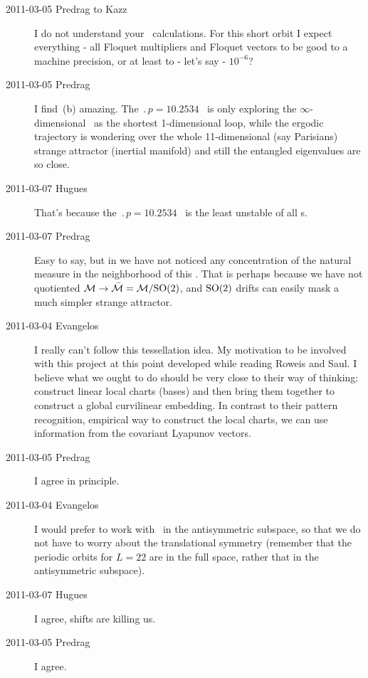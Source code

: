 \begin{description}
\item[2011-03-05 Predrag to Kazz] I do not understand your \po\ calculations.
For this short orbit I expect everything - all Floquet multipliers and
Floquet vectors to be good to a machine precision, or at least to - let's say -
$10^{-6}$?

\item[2011-03-05 Predrag]
I find
\,(b) amazing. The $\period{p}=10.2534$ \po\ is
only exploring the $\infty$-dimensional \statesp\ as the
shortest 1-dimensional loop, while the ergodic trajectory is
wondering over the whole 11-dimensional (say Parisians) strange attractor
(inertial manifold) and still the entangled eigenvalues are so close.

\item[2011-03-07 Hugues]
That's because the $\period{p}=10.2534$ \po\ is the least unstable of all
\po s.

\item[2011-03-07 Predrag] Easy to say, but in  we have
not noticed any concentration of the natural measure in the neighborhood of
this \po. That is perhaps because we have not quotiented
${\cal M} \to \bar{\cal M} = {\cal M}/\textrm{SO}(2)$, and $\textrm{SO}(2)$ drifts can easily
mask a much simpler strange attractor.


\item[2011-03-04 Evangelos]
I really can't follow this tessellation idea. My motivation to be
involved with this project at this point developed while reading Roweis
and Saul. I believe what we ought to do should be very close
to their way of thinking: construct linear local charts (bases) and then
bring them together to construct a global curvilinear embedding. In
contrast to their pattern recognition, empirical way to construct the
local charts, we can use information from the covariant Lyapunov vectors.

\item[2011-03-05 Predrag]
I agree in principle.

\item[2011-03-04 Evangelos]
I would prefer to work with \KS\ in the antisymmetric subspace, so that we do not
have to worry about the translational symmetry (remember that the periodic
orbits for $L=22$ are in the full space, rather that in the antisymmetric
subspace).

\item[2011-03-07 Hugues]
I agree, shifts are killing us.

\item[2011-03-05 Predrag]
I agree.



\end{description}
